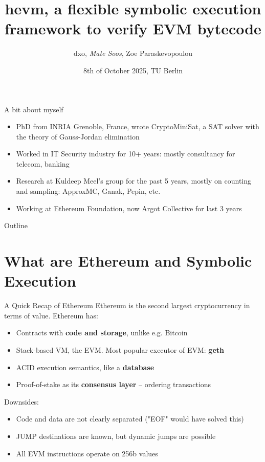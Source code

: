 \documentclass[aspectratio=169]{beamer}
\title[hevm]{
hevm, a flexible symbolic execution framework to verify EVM bytecode}
\author[dxo, Soos, Paraskevopoulou]{dxo, \emph{Mate Soos}, Zoe Paraskevopoulou}
\institute[Argot]{\large Argot Collective (\url{https://argot.org})}
\date{8th of October 2025, TU Berlin}
\begin{document}
\begin{frame}
    \titlepage
\end{frame}

\begin{frame}{A bit about myself}
\begin{itemize}
\item PhD from INRIA Grenoble, France, wrote CryptoMiniSat, a SAT solver with
    the theory of Gauss-Jordan elimination
\item Worked in IT Security industry for 10+ years: mostly consultancy for telecom, banking
\item Research at Kuldeep Meel's group for the past 5 years, mostly on counting
    and sampling: ApproxMC, Ganak, Pepin, etc.
\item Working at Ethereum Foundation, now Argot Collective for last 3 years
\end{itemize}
\end{frame}

\begin{frame}{Outline}
    \tableofcontents
\end{frame}

\section{What are Ethereum and Symbolic Execution}

\begin{frame}{A Quick Recap of Ethereum}
Ethereum is the second largest cryptocurrency in terms of value. Ethereum has:
\begin{itemize}
\item Contracts with \textbf{code and storage}, unlike e.g. Bitcoin
\item Stack-based VM, the EVM. Most popular executor of EVM: \textbf{geth}
\item ACID execution semantics, like a \textbf{database}
\item Proof-of-stake as its \textbf{consensus layer} -- ordering transactions
\end{itemize}

Downsides:
\begin{itemize}
\item Code and data are not clearly separated ("EOF" would have solved this)
\item JUMP destinations are known, but dynamic jumps are possible
\item All EVM instructions operate on 256b values
\end{itemize}

\end{frame}
\end{document}
